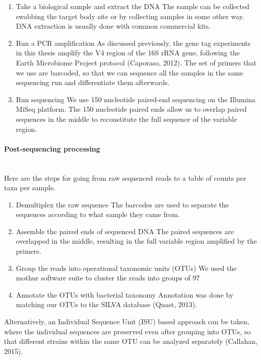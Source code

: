 \begin{enumerate}
\item Take a biological sample and extract the DNA
The sample can be collected swabbing the target body site or by collecting samples in some other way. DNA extraction is usually done with common commercial kits.

\item Run a PCR amplification
As discussed previously, the gene tag experiments in this thesis amplify the V4 region of the 16S rRNA gene, following the Earth Microbiome Project protocol (Caporaso, 2012). The set of primers that we use are barcoded, so that we can sequence all the samples in the same sequencing run and differentiate them afterwards.

\item Run sequencing
We use 150 nucleotide paired-end sequencing on the Illumina MiSeq platform. The 150 nucleotide paired ends allow us to overlap paired sequences in the middle to reconstitute the full sequence of the variable region.
\end{enumerate}

\paragraph{Post-sequencing processing}\mbox{}\\
Here are the steps for going from raw sequenced reads to a table of counts per taxa per sample.
\begin{enumerate}
\item Demultiplex the raw sequence
The barcodes are used to separate the sequences according to what sample they came from.

\item Assemble the paired ends of sequenced DNA
The paired sequences are overlapped in the middle, resulting in the full variable region amplified by the primers.

\item Group the reads into operational taxonomic units (OTUs)
We used the mothur software suite to cluster the reads into groups of 97%

\item Annotate the OTUs with bacterial taxonomy
Annotation was done by  matching our OTUs to the SILVA database (Quast, 2013).
\end{enumerate}

Alternatively, an Individual Sequence Unit (ISU) based approach can be taken, where the individual sequences are preserved even after grouping into OTUs, so that different strains within the same OTU can be analyzed separately (Callahan, 2015).

